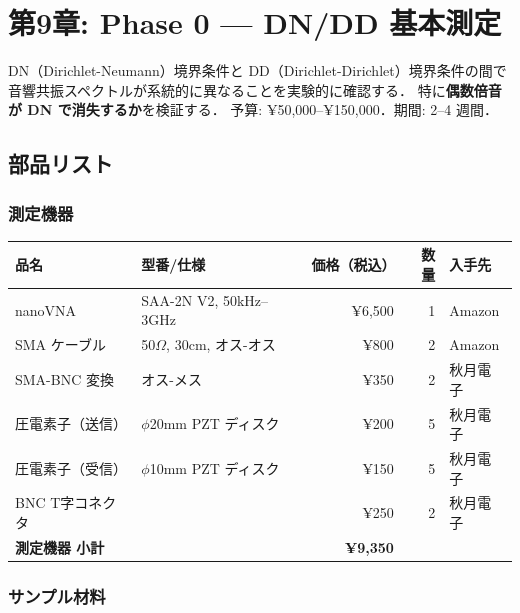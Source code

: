 \section{第9章: Phase 0 — DN/DD 基本測定}

\begin{experimentbox}
DN（Dirichlet-Neumann）境界条件と DD（Dirichlet-Dirichlet）境界条件の間で
音響共振スペクトルが系統的に異なることを実験的に確認する．
特に\textbf{偶数倍音が DN で消失するか}を検証する．
予算: ¥50,000--¥150,000．期間: 2--4 週間．
\end{experimentbox}

\subsection{部品リスト}

\subsubsection{測定機器}

\begin{center}
\small
\begin{tabular}{llrrl}
\toprule
品名 & 型番/仕様 & 価格（税込） & 数量 & 入手先 \\
\midrule
nanoVNA & SAA-2N V2, 50kHz--3GHz & ¥6,500 & 1 & Amazon \\
SMA ケーブル & 50$\Omega$, 30cm, オス-オス & ¥800 & 2 & Amazon \\
SMA-BNC 変換 & オス-メス & ¥350 & 2 & 秋月電子 \\
圧電素子（送信） & $\phi$20mm PZT ディスク & ¥200 & 5 & 秋月電子 \\
圧電素子（受信） & $\phi$10mm PZT ディスク & ¥150 & 5 & 秋月電子 \\
BNC T字コネクタ & & ¥250 & 2 & 秋月電子 \\
\midrule
\multicolumn{2}{l}{\textbf{測定機器 小計}} & \textbf{¥9,350} & & \\
\bottomrule
\end{tabular}
\end{center}

\subsubsection{サンプル材料}

